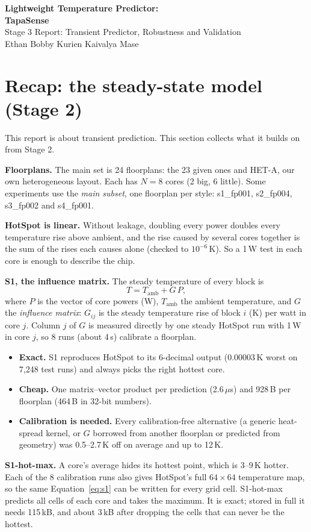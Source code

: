 \documentclass[11pt,a4paper]{article}
\newcommand{\us}{\,$\mu$s}
\begin{document}
\begin{center}
{\LARGE\bfseries Lightweight Temperature Predictor:}\\[4pt]
{\Large\bfseries TapaSense}\\[8pt]
{\large Stage 3 Report: Transient Predictor, Robustness and Validation}\\[6pt]
Ethan Bobby Kurien \quad Kaivalya Mase
\end{center}

\section{Recap: the steady-state model (Stage 2)}\label{sec:recap}
This report is about transient prediction. This section collects what it builds on from Stage 2.

\textbf{Floorplans.} The main set is 24 floorplans: the 23 given ones and HET-A, our own
heterogeneous layout. Each has $N = 8$ cores (2 big, 6 little). Some experiments use the
\emph{main subset}, one floorplan per style: s1\_fp001, s2\_fp004, s3\_fp002 and s4\_fp001.

\textbf{HotSpot is linear.} Without leakage, doubling every power doubles every temperature rise
above ambient, and the rise caused by several cores together is the sum of the rises each causes
alone (checked to $10^{-6}$\,K). So a 1\,W test in each core is enough to describe the chip.

\textbf{S1, the influence matrix.} The steady temperature of every block is
\begin{equation}
  T = T_\text{amb} + G\,P,
  \label{eq:s1}
\end{equation}
where $P$ is the vector of core powers (W), $T_\text{amb}$ the ambient temperature, and $G$ the
\emph{influence matrix}: $G_{ij}$ is the steady temperature rise of block $i$ (K) per watt in core
$j$. Column $j$ of $G$ is measured directly by one steady HotSpot run with 1\,W in core $j$, so
8 runs (about 4\,s) calibrate a floorplan.
\begin{itemize}
  \item \textbf{Exact.} S1 reproduces HotSpot to its 6-decimal output (0.00003\,K worst on 7{,}248
        test runs) and always picks the right hottest core.
  \item \textbf{Cheap.} One matrix--vector product per prediction (2.6\us) and 928\,B per
        floorplan (464\,B in 32-bit numbers).
  \item \textbf{Calibration is needed.} Every calibration-free alternative (a generic heat-spread
        kernel, or $G$ borrowed from another floorplan or predicted from geometry) was 0.5--2.7\,K
        off on average and up to 12\,K.
\end{itemize}
\textbf{S1-hot-max.} A core's average hides its hottest point, which is 3--9\,K hotter. Each of
the 8 calibration runs also gives HotSpot's full $64\times64$ temperature map, so the same
Equation~\eqref{eq:s1} can be written for every grid cell. S1-hot-max predicts all cells of each
core and takes the maximum. It is exact; stored in full it needs 115\,kB, and about 3\,kB after
dropping the cells that can never be the hottest.
\end{document}
